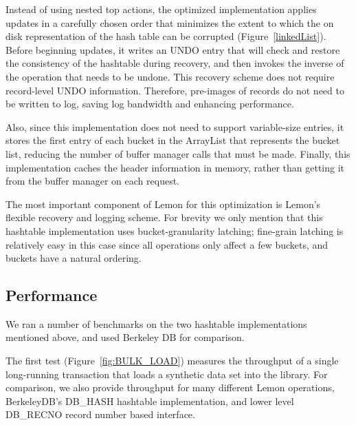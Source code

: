 \documentclass[10pt,letterpaper,twocolumn,english]{article}
\newcommand{\yad}{Lemon\xspace}
\begin{document}
Instead of using nested top actions, the optimized implementation
applies updates in a carefully chosen order that minimizes the extent
to which the on disk representation of the hash table can be
corrupted (Figure~\ref{linkedList}). Before beginning updates, it
writes an UNDO entry that will check and restore the consistency of
the hashtable during recovery, and then invokes the inverse of the
operation that needs to be undone.  This recovery scheme does not
require record-level UNDO information.  Therefore, pre-images of
records do not need to be written to log, saving log bandwidth and
enhancing performance.

Also, since this implementation does not need to support variable-size
entries, it stores the first entry of each bucket in the ArrayList
that represents the bucket list, reducing the number of buffer manager
calls that must be made.  Finally, this implementation caches
the header information in memory, rather than getting it from the buffer manager on each request.

The most important component of \yad for this optimization is \yad's
flexible recovery and logging scheme.  For brevity we only mention
that this hashtable implementation uses bucket-granularity latching;
fine-grain latching is relatively easy in this case since all
operations only affect a few buckets, and buckets have a natural
ordering.


\subsection{Performance}

We ran a number of benchmarks on the two hashtable implementations
mentioned above, and used Berkeley DB for comparison.


The first test (Figure~\ref{fig:BULK_LOAD}) measures the throughput of
a single long-running
transaction that loads a synthetic data set into the
library.  For comparison, we also provide throughput for many different
\yad operations, BerkeleyDB's DB\_HASH hashtable implementation,
and lower level DB\_RECNO record number based interface.  
\end{document}

